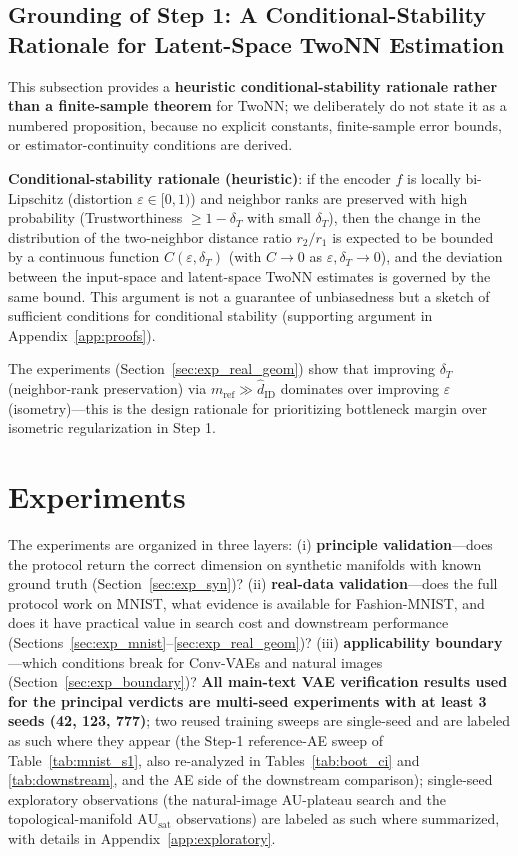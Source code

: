 \documentclass[make,article,submit,pdftex,moreauthors]{Definitions/mdpi}
\newcommand{\hatdID}{\hat{d}_{\mathrm{ID}}}
\newcommand{\AUsat}{\mathrm{AU}_{\mathrm{sat}}}
\begin{document}
\subsection{Grounding of Step 1: A Conditional-Stability Rationale for Latent-Space TwoNN Estimation}\label{sec:theory_twonn}

This subsection provides a \textbf{heuristic conditional-stability
rationale rather than a finite-sample theorem} for TwoNN; we deliberately
do not state it as a numbered proposition, because no explicit constants,
finite-sample error bounds, or estimator-continuity conditions are
derived.

\textbf{Conditional-stability rationale (heuristic)}:
if the encoder $f$ is locally bi-Lipschitz (distortion
$\varepsilon \in [0,1)$) and neighbor ranks are preserved with high
probability (Trustworthiness $\geq 1 - \delta_T$ with small $\delta_T$),
then the change in the distribution of the two-neighbor distance ratio
$r_2/r_1$ is expected to be bounded by a continuous function
$C(\varepsilon, \delta_T)$ (with $C \to 0$ as
$\varepsilon, \delta_T \to 0$), and the deviation between the input-space
and latent-space TwoNN estimates is governed by the same bound.
This argument is not a guarantee of unbiasedness but a sketch of
sufficient conditions for conditional stability (supporting argument in
Appendix~\ref{app:proofs}).

The experiments (Section~\ref{sec:exp_real_geom}) show that improving
$\delta_T$ (neighbor-rank preservation) via $m_{\mathrm{ref}} \gg \hatdID$
dominates over improving $\varepsilon$ (isometry)---this is the design
rationale for prioritizing bottleneck margin over isometric regularization
in Step 1.

\section{Experiments}\label{sec:exp}

The experiments are organized in three layers:
(i) \textbf{principle validation}---does the protocol return the correct
dimension on synthetic manifolds with known ground truth
(Section~\ref{sec:exp_syn})?
(ii) \textbf{real-data validation}---does the full protocol work on MNIST,
what evidence is available for Fashion-MNIST, and does it have practical
value in search cost and downstream performance
(Sections~\ref{sec:exp_mnist}--\ref{sec:exp_real_geom})?
(iii) \textbf{applicability boundary}---which conditions break for
Conv-VAEs and natural images (Section~\ref{sec:exp_boundary})?
\textbf{All main-text VAE verification results used for the principal
verdicts are multi-seed experiments with at least 3 seeds (42, 123, 777)};
two reused training sweeps are single-seed and are labeled as such where
they appear (the Step-1 reference-AE sweep of Table~\ref{tab:mnist_s1},
also re-analyzed in Tables~\ref{tab:boot_ci} and \ref{tab:downstream}, and
the AE side of the downstream comparison); single-seed exploratory
observations (the natural-image AU-plateau search and the
topological-manifold $\AUsat$ observations) are labeled as such where
summarized, with details in Appendix~\ref{app:exploratory}.
\end{document}
